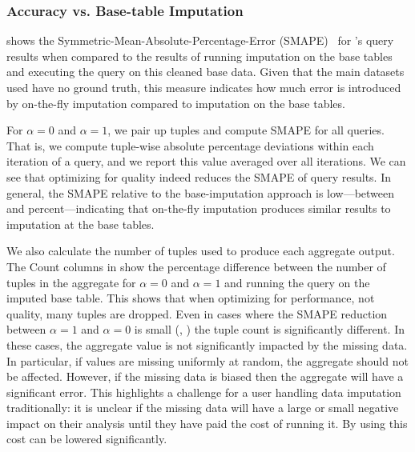 \vspace{0.5in}
\subsubsection{Accuracy vs. Base-table Imputation}

 shows the Symmetric-Mean-Absolute-Percentage-Error (SMAPE)~\cite{Makridakis2000451} for
\ProjectName{}'s query results when compared to the results of running imputation on the base tables and
executing the query on this cleaned base data. Given that the main datasets used
have no ground truth, this measure indicates how much error is introduced by on-the-fly imputation compared
to imputation on the base tables.

For $\alpha=0$ and $\alpha=1$, we pair up tuples and compute SMAPE for all queries. That is,
we compute tuple-wise absolute percentage deviations within each iteration of a query, and
we report this value averaged over all iterations.  We
can see that optimizing for quality indeed reduces the SMAPE of query results.  In general, the SMAPE relative 
to the base-imputation approach is low---between
\lowsmapealphazero{} and \highsmapealphaoneexacs{} percent---indicating that on-the-fly
imputation produces similar results to imputation at the base tables.

We also calculate the number of tuples used to produce each aggregate output.
The Count columns in  show the percentage difference between the number of tuples in the aggregate for $\alpha = 0$ and $\alpha = 1$ and running the query on the imputed base table.
This shows that when optimizing for performance, not quality, many tuples are dropped.
Even in cases where the SMAPE reduction between $\alpha = 1$ and $\alpha = 0$ is small (, ) the tuple count is significantly different.
In these cases, the aggregate value is not significantly impacted by the missing data. In particular, if values are missing uniformly at random,
the aggregate should not be affected.
However, if the missing data is biased then the aggregate will have a significant error.
This highlights a challenge for a user handling data imputation traditionally: it is unclear if the missing data will have a large or small negative impact on their analysis until they have paid the cost of running it.
By using \ProjectName{} this cost can be lowered significantly.

